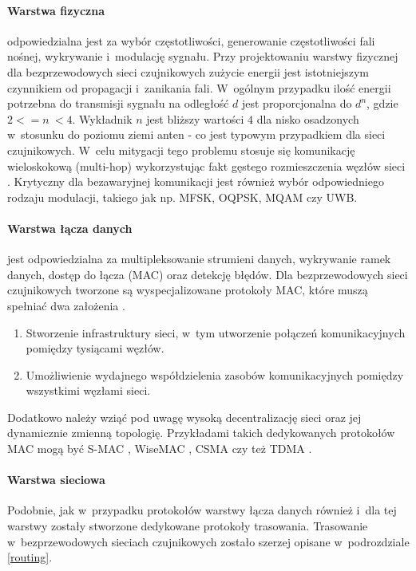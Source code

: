 \paragraph{Warstwa fizyczna}
odpowiedzialna jest za wybór częstotliwości, generowanie częstotliwości fali nośnej, wykrywanie i~modulację sygnału. Przy projektowaniu warstwy fizycznej dla bezprzewodowych sieci czujnikowych zużycie energii jest istotniejszym czynnikiem od propagacji i~zanikania fali. W~ogólnym przypadku ilość energii potrzebna do transmisji sygnału na odległość $d$ jest proporcjonalna do $d^{n}$, gdzie $2 <= n~< 4$. Wykładnik $n$ jest bliższy wartości $4$ dla nisko osadzonych w~stosunku do poziomu ziemi anten \cite{Sohrabi1999} - co jest typowym przypadkiem dla sieci czujnikowych. W~celu mitygacji tego problemu stosuje się komunikację wieloskokową (multi-hop) wykorzystując fakt gęstego rozmieszczenia węzłów sieci \cite{Akyildiz2002.09}.
Krytyczny dla bezawaryjnej komunikacji jest również wybór odpowiedniego rodzaju modulacji, takiego jak np. MFSK, OQPSK, MQAM czy UWB.

\paragraph{Warstwa łącza danych}
jest odpowiedzialna za multipleksowanie strumieni danych, wykrywanie ramek danych, dostęp do łącza (MAC) oraz detekcję błędów. Dla bezprzewodowych sieci czujnikowych tworzone są wyspecjalizowane protokoły MAC, które muszą spełniać dwa założenia \cite{Akyildiz2002.09, Demirkol2006}.
\begin{enumerate}
\item Stworzenie infrastruktury sieci, w~tym utworzenie połączeń komunikacyjnych pomiędzy tysiącami węzłów.
\item Umożliwienie wydajnego współdzielenia zasobów komunikacyjnych pomiędzy wszystkimi węzłami sieci.
\end{enumerate}
Dodatkowo należy wziąć pod uwagę wysoką decentralizację sieci oraz jej dynamicznie zmienną topologię. Przykładami takich dedykowanych protokołów MAC mogą być S-MAC \cite{Ye2002}, WiseMAC \cite{Hoiydi2004}, CSMA \cite{Althobaiti2015} czy też TDMA \cite{Althobaiti2015}.

\paragraph{Warstwa sieciowa}
Podobnie, jak w~przypadku protokołów warstwy łącza danych również i~dla tej warstwy zostały stworzone dedykowane protokoły trasowania. Trasowanie w~bezprzewodowych sieciach czujnikowych zostało szerzej opisane w~podrozdziale \ref{routing}.


